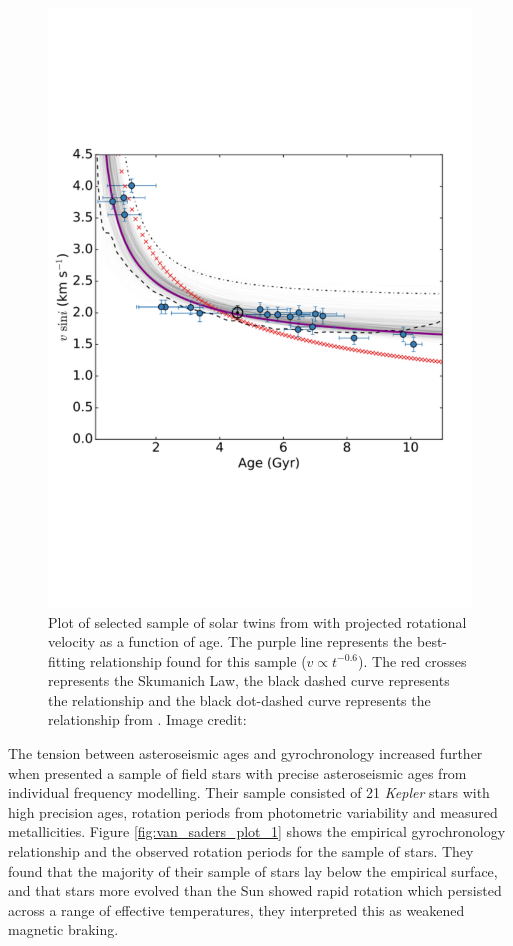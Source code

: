 \begin{figure}[h]
    \centering
    \includegraphics[scale=0.45]{Figures/2-Historical_overview/dos_santos_2016.pdf}
    \caption[Rotational evolution of sample of solar twins from \citet{dos_Santos_etal_2016} ]{Plot of selected sample of solar twins from \citet{dos_Santos_etal_2016} with projected rotational velocity as a function of age. The purple line represents the best-fitting relationship found for this sample ($v \propto t^{-0.6}$). The red crosses represents the Skumanich Law, the black dashed curve represents the \citet{do_Nascimento_etal_2014} relationship and the black dot-dashed curve represents the relationship from \citet{Pace_Pasquini_2004}. Image credit: \citet{dos_Santos_etal_2016}}
    \label{fig:dos_santos_2016}
\end{figure}

The tension between asteroseismic ages and gyrochronology increased further when \citet{van_Saders_etal_2016} presented a sample of field stars with precise asteroseismic ages from individual frequency modelling. Their sample consisted of 21 \textit{Kepler} stars with high precision ages, rotation periods from photometric variability and measured metallicities. Figure \ref{fig:van_saders_plot_1} shows the empirical gyrochronology relationship and the observed rotation periods for the \citet{van_Saders_etal_2016} sample of stars. They found that the majority of their sample of stars lay below the empirical surface, and that stars more evolved than the Sun showed rapid rotation which persisted across a range of effective temperatures, they interpreted this as weakened magnetic braking.

